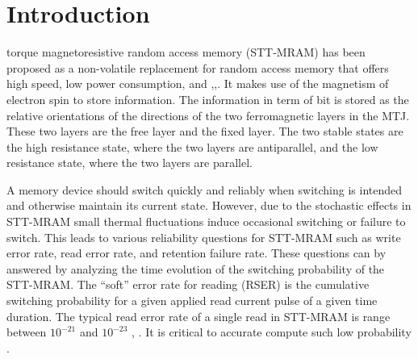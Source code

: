 \documentclass[journal,transmag]{IEEEtran}
\begin{document}
%
\IEEEpeerreviewmaketitle



\section{Introduction}
%
%
%
%
 torque magnetoresistive random access memory (STT-MRAM) has been proposed as a non-volatile replacement for random access memory that offers high speed, low power consumption, and   \cite{5467394},\cite{5424368},\cite{4242474}. It makes use of the magnetism of electron spin to store information. The information in term of bit is stored as the relative orientations of the directions of the two ferromagnetic layers in the MTJ. These two layers are the free layer and the fixed layer. The two stable states are the high resistance state, where the two layers are antiparallel, and the low resistance state, where the two layers are parallel.

A memory device should switch quickly and reliably when switching is intended and otherwise maintain its current state. However, due to the stochastic effects in STT-MRAM small thermal fluctuations induce occasional switching or failure to switch. This leads to various reliability questions for STT-MRAM such as write error rate, read error rate, and retention failure rate. These questions can by answered by analyzing the time evolution of the switching probability of the STT-MRAM.  The ``soft'' error rate for reading (RSER) is the cumulative switching probability for a given applied read current pulse of a given time duration. The typical read error rate of a single read in STT-MRAM is range between $10^{-21}$ and $10^{-23}$ \cite{7035342}, \cite{Apalkov:2013:STM:2463585.2463589}. It is critical to accurate compute such low probability \cite{6332615}.
\end{document}
